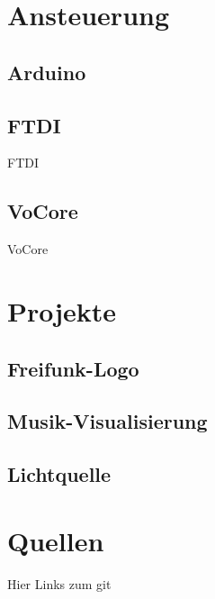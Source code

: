 \documentclass{beamer}
\begin{document}
\section{Ansteuerung}
\subsection{Arduino}
\begin{frame}
\end{frame}

\subsection{FTDI}
\begin{frame}{FTDI}
\end{frame}


\subsection{VoCore}
\begin{frame}{VoCore}
\end{frame}

\section{Projekte}
\subsection{Freifunk-Logo}
\begin{frame}
\end{frame}

\subsection{Musik-Visualisierung}
\begin{frame}
\end{frame}

\subsection{Lichtquelle}
\begin{frame}
\end{frame}

\section{Quellen}
\begin{frame}
 Hier Links zum git
\end{frame}
\end{document}
